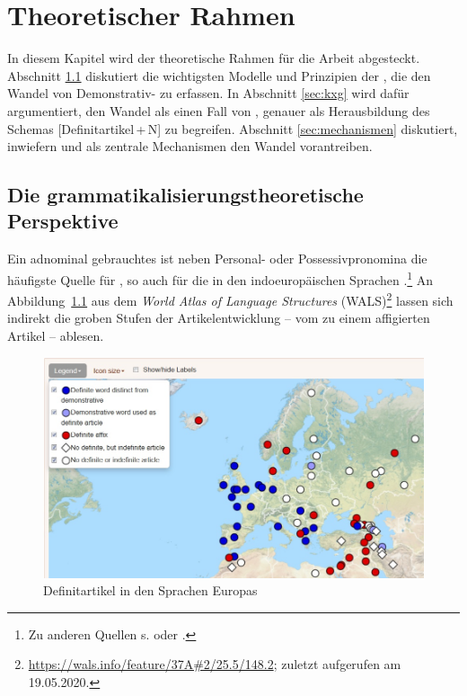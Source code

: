 \chapter{Theoretischer Rahmen} \label{chapter:theorie}

In diesem Kapitel wird der theoretische Rahmen für die Arbeit abgesteckt. 
Abschnitt \ref{sec:gram} diskutiert die wichtigsten Modelle und Prinzipien  der , die den Wandel von Demonstrativ- zu  erfassen. In Abschnitt \ref{sec:kxg} wird dafür argumentiert, den Wandel als einen Fall von , genauer als Herausbildung des Schemas  [Definitartikel\,+\,N] zu begreifen. Abschnitt \ref{sec:mechanismen} diskutiert, inwiefern  und  als zentrale Mechanismen den Wandel vorantreiben.   

\section{Die grammatikalisierungstheoretische Perspektive}\label{sec:gram}

Ein adnominal gebrauchtes  ist neben Personal-  oder Possessivpronomina   die häufigste Quelle für  \parencites()(){Himmelmann1997}[215]{Heine2002}, so auch für die  in den indoeuropäischen Sprachen \parencite{vonHeusinger2013}.\footnote{Zu anderen Quellen s. \textcite[839]{Himmelmann2001} oder \textcite[523]{deMulder2011}.}
An Abbildung~\ref{wals} aus dem \textit{World Atlas of Language Structures} (WALS)\footnote{\url{https://wals.info/feature/37A\#2/25.5/148.2}; zuletzt aufgerufen am 19.05.2020.} lassen sich indirekt die groben Stufen der Artikelentwicklung -- vom  zu einem affigierten Artikel  -- ablesen. 

\begin{figure}
\begin{center}
  \includegraphics[width=\textwidth]{images/wals.jpg}
\caption {Definitartikel in den Sprachen Europas \parencite{Dryer2013}}
\label{wals}
\end{center}
\end{figure} 

